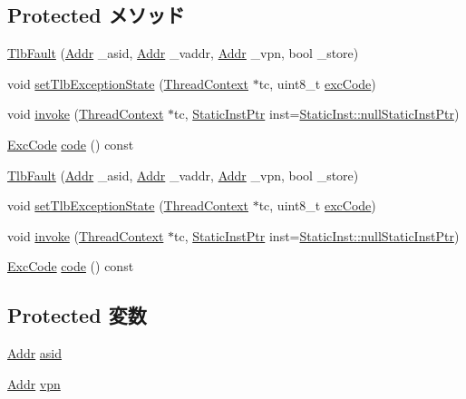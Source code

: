 \subsection*{Protected メソッド}
\begin{DoxyCompactItemize}
\item 
\hyperlink{classMipsISA_1_1TlbFault_ad6702f244bca94847f8907ae0084f7cc}{TlbFault} (\hyperlink{classm5_1_1params_1_1Addr}{Addr} \_\-asid, \hyperlink{classm5_1_1params_1_1Addr}{Addr} \_\-vaddr, \hyperlink{classm5_1_1params_1_1Addr}{Addr} \_\-vpn, bool \_\-store)
\item 
void \hyperlink{classMipsISA_1_1TlbFault_a063e32df265a515397ce13a84a741fed}{setTlbExceptionState} (\hyperlink{classThreadContext}{ThreadContext} $\ast$tc, uint8\_\-t \hyperlink{namespaceMipsISA_a9125816703baa612f861e8efd7a5d567}{excCode})
\item 
void \hyperlink{classMipsISA_1_1TlbFault_a2bd783b42262278d41157d428e1f8d6f}{invoke} (\hyperlink{classThreadContext}{ThreadContext} $\ast$tc, \hyperlink{classRefCountingPtr}{StaticInstPtr} inst=\hyperlink{classStaticInst_aa793d9793af735f09096369fb17567b6}{StaticInst::nullStaticInstPtr})
\item 
\hyperlink{namespaceMipsISA_abcc8a7c57cd8becefbfd621dbff5ffd4}{ExcCode} \hyperlink{classMipsISA_1_1TlbFault_a1dd20a2460d7723d3eaa287b7cc07e79}{code} () const 
\item 
\hyperlink{classMipsISA_1_1TlbFault_ad6702f244bca94847f8907ae0084f7cc}{TlbFault} (\hyperlink{classm5_1_1params_1_1Addr}{Addr} \_\-asid, \hyperlink{classm5_1_1params_1_1Addr}{Addr} \_\-vaddr, \hyperlink{classm5_1_1params_1_1Addr}{Addr} \_\-vpn, bool \_\-store)
\item 
void \hyperlink{classMipsISA_1_1TlbFault_a063e32df265a515397ce13a84a741fed}{setTlbExceptionState} (\hyperlink{classThreadContext}{ThreadContext} $\ast$tc, uint8\_\-t \hyperlink{namespaceMipsISA_a9125816703baa612f861e8efd7a5d567}{excCode})
\item 
void \hyperlink{classMipsISA_1_1TlbFault_a2bd783b42262278d41157d428e1f8d6f}{invoke} (\hyperlink{classThreadContext}{ThreadContext} $\ast$tc, \hyperlink{classRefCountingPtr}{StaticInstPtr} inst=\hyperlink{classStaticInst_aa793d9793af735f09096369fb17567b6}{StaticInst::nullStaticInstPtr})
\item 
\hyperlink{namespaceMipsISA_abcc8a7c57cd8becefbfd621dbff5ffd4}{ExcCode} \hyperlink{classMipsISA_1_1TlbFault_a1dd20a2460d7723d3eaa287b7cc07e79}{code} () const 
\end{DoxyCompactItemize}
\subsection*{Protected 変数}
\begin{DoxyCompactItemize}
\item 
\hyperlink{classm5_1_1params_1_1Addr}{Addr} \hyperlink{classMipsISA_1_1TlbFault_a3bd75b410169a5c0e356fda4d021e49c}{asid}
\item 
\hyperlink{classm5_1_1params_1_1Addr}{Addr} \hyperlink{classMipsISA_1_1TlbFault_ad378f7d20675898b2a5994600528fa9a}{vpn}
\end{DoxyCompactItemize}
